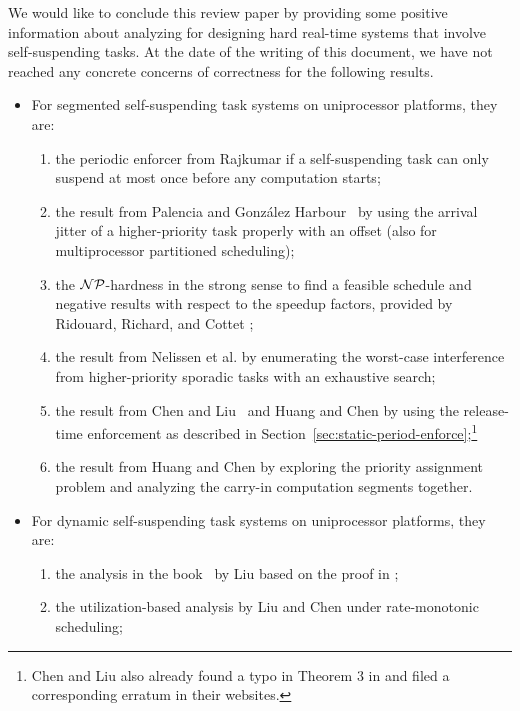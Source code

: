 We would like to conclude this review paper by providing some positive
information about analyzing for designing hard real-time systems that
involve self-suspending tasks.  At the date of the writing of this
document, we have not reached any concrete concerns of correctness for
the following results.
\begin{itemize}
\item For segmented self-suspending task systems on uniprocessor
  platforms, they are: 
  \begin{enumerate}
  \item the periodic enforcer from Rajkumar \cite{Raj:suspension1991}
    if a self-suspending task
    can only suspend at most once before any computation starts;
  \item the result from Palencia and Gonz\'alez
    Harbour~\cite{PH:rtss98} by using the arrival jitter of a
    higher-priority task properly with an offset (also for
    multiprocessor partitioned scheduling);
  \item the ${\cal NP}$-hardness in the strong sense to find a feasible
    schedule and negative results with respect to the speedup factors,
    provided by Ridouard, Richard, and Cottet \cite{Ridouard_2004};
  \item the result from Nelissen et al. \cite{ecrts15nelissen} by
    enumerating the worst-case interference from higher-priority
    sporadic tasks with an exhaustive search;
  \item the result from Chen and Liu~\cite{RTSS-ChenL14} and Huang and
    Chen \cite{WC16-suspend-DATE} by using the release-time
    enforcement as described in
    Section~\ref{sec:static-period-enforce};\footnote{Chen and Liu
      also already found a typo in Theorem 3 in \cite{RTSS-ChenL14}
      and filed a corresponding erratum in their websites.}
  \item the result from Huang and Chen \cite{Huang:multiseg} by
    exploring the priority assignment problem and analyzing the
    carry-in computation segments together.
  \end{enumerate}
\item For dynamic self-suspending task systems on uniprocessor
  platforms, they are:
  \begin{enumerate}
  \item the analysis in the book~\cite[Pages
    164-165]{Liu:2000:RS:518501} by Liu based on the proof in \cite{ChenHuangNelissen}; 
  \item the utilization-based analysis by Liu and Chen
    \cite{LiuChen:rtss2014} under rate-monotonic scheduling;

\end{enumerate}
\end{itemize}
